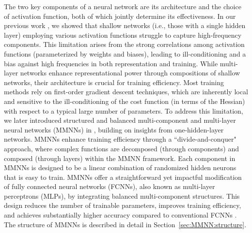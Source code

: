 \documentclass[11pt,a4paper]{article}
\begin{document}
The two key components of a neural network are its architecture and the choice of activation function, both of which jointly determine its effectiveness. In our previous work \cite{ZZZZ-23}, we showed that shallow networks (i.e., those with a single hidden layer) employing various activation functions struggle to capture high-frequency components. This limitation arises from the strong correlations among activation functions (parameterized by weights and biases), leading to ill-conditioning and a bias against high frequencies in both representation and training.
While multi-layer networks enhance representational power through compositions of shallow networks, their architecture is crucial for training efficiency. Most training methods rely on first-order gradient descent techniques, which are inherently local and sensitive to the ill-conditioning of the cost function (in terms of the Hessian) with respect to a typical large number of parameters.
To address this limitation, we later introduced structured and balanced multi-component and multi-layer neural networks (MMNNs) in \cite{ZZZZ-24-MMNN}, building on insights from one-hidden-layer networks. MMNNs enhance training efficiency through a ``divide-and-conquer" approach, where complex functions are decomposed (through components) and composed (through layers) within the MMNN framework. Each component in MMNNs is designed to be a linear combination of randomized hidden neurons that is easy to train.
MMNNs offer a straightforward yet impactful modification of fully connected neural networks (FCNNs), also known as multi-layer perceptrons (MLPs), by integrating balanced multi-component structures. This design reduces the number of trainable parameters, improves training efficiency, and achieves substantially higher accuracy compared to conventional FCNNs \cite{ZZZZ-24-MMNN}.
The structure of MMNNs is described in detail in Section~\ref{sec:MMNN:structure}.
\end{document}
